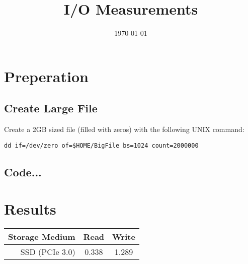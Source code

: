 \documentclass[a4paper,12pt,oneside, title]{article}
\begin{document}
\title{I/O Measurements}
\date{\today}
\maketitle
\tableofcontents

\section{Preperation}
\subsection{Create Large File}
Create a 2GB sized file (filled with zeros) with the following UNIX command:
\par\medskip
\texttt{dd if=/dev/zero of=\$HOME/BigFile bs=1024 count=2000000}
\par\medskip\noindent

\subsection{Code...}

\section{Results}
\begin{tabular}{| r | c | c |}
  \hline
  \textbf{Storage Medium} & \textbf{Read} & \textbf{Write} \\   \hline
  SSD (PCIe 3.0) & 0.338 & 1.289 \\  \hline
\end{tabular}
\end{document}
